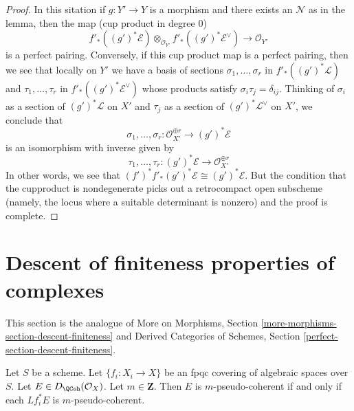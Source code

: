 \begin{proof}
\medskip\noindent
In this sitation if $g : Y' \to Y$ is a morphism and there exists an
$\mathcal{N}$ as in the lemma, then the map (cup product in degree $0$)
$$
f'_*((g')^*\mathcal{E})
\otimes_{\mathcal{O}_{Y'}}
f'_*((g')^*\mathcal{E}^\vee)
\longrightarrow \mathcal{O}_{Y'}
$$
is a perfect pairing. Conversely, if this cup product map is a
perfect pairing, then we see that locally on $Y'$ we have
a basis of sections
$\sigma_1, \ldots, \sigma_r$ in $f'_*((g')^*\mathcal{L})$ and
$\tau_1, \ldots, \tau_r$ in
$f'_*((g')^*\mathcal{E}^\vee)$ whose products satisfy
$\sigma_i \tau_j = \delta_{ij}$. Thinking of $\sigma_i$
as a section of $(g')^*\mathcal{L}$ on $X'$
and $\tau_j$ as a section of $(g')^*\mathcal{L}^\vee$ on $X'$,
we conclude that
$$
\sigma_1, \ldots, \sigma_r :
\mathcal{O}_{X'}^{\oplus r}
\longrightarrow
(g')^*\mathcal{E}
$$
is an isomorphism with inverse given by
$$
\tau_1, \ldots, \tau_r :
(g')^*\mathcal{E}
\longrightarrow
\mathcal{O}_{X'}^{\oplus r}
$$
In other words, we see that
$(f')^*f'_*(g')^*\mathcal{E} \cong (g')^*\mathcal{E}$.
But the condition that the cupproduct is nondegenerate
picks out a retrocompact open subscheme (namely, the locus where a suitable
determinant is nonzero) and the proof is complete.
\end{proof}









\section{Descent of finiteness properties of complexes}
\label{section-descent-finiteness}

\noindent
This section is the analogue of More on Morphisms,
Section \ref{more-morphisms-section-descent-finiteness}
and
Derived Categories of Schemes, Section
\ref{perfect-section-descent-finiteness}.

\begin{lemma}
\label{lemma-pseudo-coherent-descends-fpqc}
Let $S$ be a scheme. Let $\{f_i : X_i \to X\}$ be an fpqc covering of
algebraic spaces over $S$. Let $E \in D_\QCoh(\mathcal{O}_X)$.
Let $m \in \mathbf{Z}$. Then $E$ is $m$-pseudo-coherent if and only if each
$Lf_i^*E$ is $m$-pseudo-coherent.
\end{lemma}

